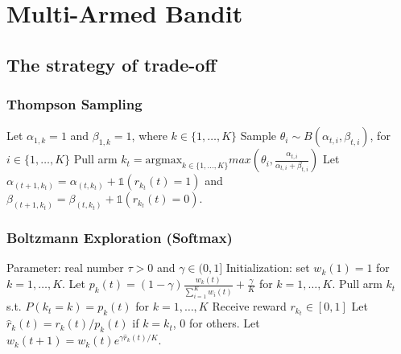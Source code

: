 \section*{Multi-Armed Bandit}
\subsection*{The strategy of trade-off}
\subsubsection*{Thompson Sampling}

\begin{algo}
\label{algo:thompson3}
\begin{algorithmic}
\STATE {\ }
\STATE Let $\alpha_{1,k} = 1$ and $\beta_{1,k} = 1$, where $k\in \{1,\dots,K\}$
	\STATE Sample $\theta_i\sim B(\alpha_{t,i},\beta_{t,i})$, for $i\in \{1,\dots,K\}$
    \STATE Pull arm $k_t = \text{argmax}_{k\in \{1,\dots,K\}} max\left(\theta_i,\frac{\alpha_{t,i}}{\alpha_{t,i}+\beta_{t,i}}\right)$
	\STATE Let $\alpha_{(t+1,k_t)}= \alpha_{(t,k_t)} + \mathds{1}(r_{k_t}(t) = 1)$ and $\beta_{(t+1,k_t)} = \beta_{(t,k_t)}+\mathds{1}(r_{k_t}(t) = 0)$.
\ENDFOR
\end{algorithmic}
\end{algo}
\subsubsection*{Boltzmann Exploration (Softmax)}

\begin{algo}[Exp3]
\label{algo:softmax2}
\begin{algorithmic}
\STATE {\ }
\STATE Parameter: real number $\tau>0$ and $\gamma\in (0,1]$
\STATE Initialization: set $w_k(1) = 1$ for $k = 1,\dots, K$. 
	\STATE Let $p_k(t) = (1-\gamma)\frac{w_k(t)}{\sum_{i=1}^K w_i(t)}+\frac{\gamma}{K}$ for $k=1,\dots,K$.
    	\STATE Pull arm $k_t$ s.t. $P(k_t = k) = p_k(t)$ for $k = 1,\dots, K$
   	\STATE Receive reward $r_{k_t} \in [0,1]$
	\STATE Let $\hat{r}_k(t) = r_k(t)/p_k(t)$ if $k=k_t$, $0$ for others.
	\STATE Let $w_k(t+1) = w_k(t) e^{\gamma \hat{r}_k(t)/K}$. 
\ENDFOR
\end{algorithmic}
\end{algo}

